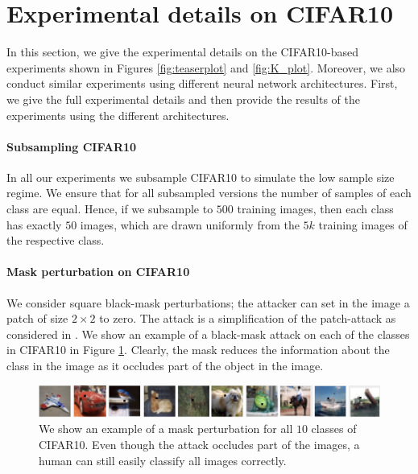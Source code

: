 \section{Experimental details on CIFAR10}
\label{sec:app_cifar10}


In this section, we give the experimental details on the CIFAR10-based experiments shown in Figures \ref{fig:teaserplot} and \ref{fig:K_plot}. Moreover, we also conduct similar experiments using different neural network architectures. First, we give the full experimental details and then provide the results of the experiments using the different architectures.

\paragraph{Subsampling CIFAR10}
In all our experiments we subsample CIFAR10 to simulate the low sample size regime. We ensure that for all subsampled versions the number of samples of each class are equal. Hence, if we subsample to $500$ training images, then each class has exactly $50$ images, which are drawn uniformly from the $5k$ training images of the respective class.

\paragraph{Mask perturbation on CIFAR10}
We consider square black-mask perturbations; the attacker can set in the image a patch of size $2 \times 2$ to zero. The attack is a simplification of the patch-attack as considered in \cite{Wu20}. We show an example of a black-mask attack on each of the classes in CIFAR10 in Figure \ref{fig:cifar10_masks}. Clearly, the mask reduces the information about the class in the image as it occludes part of the object in the image.

\begin{figure}[!ht]
\centering
  \includegraphics[width=0.8\linewidth]{plotsAistats/cifar10_black_mask_attack.png}
  \caption{We show an example of a mask perturbation for all $10$ classes of CIFAR10. Even though the attack occludes part of the images, a human can still easily classify all images correctly.}
\label{fig:cifar10_masks}
\end{figure}

